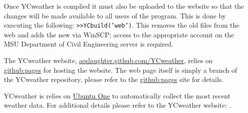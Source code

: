 Once YCweather is complied it must also be uploaded to the website so that the changes will be made available to all users of the program.  This is done by executing the following: \texttt{>>YCbuild('web')}.  This removes the old files from the web and adds the new via WinSCP; access to the appropriate account on the MSU Department of Civil Engineering server is required. 

\label{sec:web}
The YCweather website, \href{http://aeslaughter.github.com/YCweather/}{aeslaughter.github.com/YCweather}, relies on \href{http://pages.github.com}{github:pages} for hosting the website. The web page itself is simply a branch of the YCweather repository, please refer to the \href{http://pages.github.com}{github:pages} site for details.

YCweather is relies on \href{https://one.ubuntu.com/dashboard/}{Ubuntu One} to automatically collect the most recent weather data. For additional details please refer to the YCweather website: .
